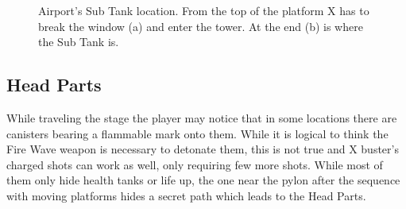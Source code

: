 \begin{figure}[h]
\begin{subfigure}{0.4\linewidth}
 		\caption{}
 	\end{subfigure}
 	\caption{Airport's Sub Tank location. From the top of the platform X has to break the window (a) and enter the tower. At the end (b) is where the Sub Tank is.}
 \end{figure}
 
\subsection{Head Parts} 
 While traveling the stage the player may notice that in some locations there are canisters bearing a flammable mark onto them. While it is logical to think the Fire Wave weapon is necessary to detonate them, this is not true and X buster's charged shots can work as well, only requiring few more shots. While most of them only hide health tanks or life up, the one near the pylon after the sequence with moving platforms hides a secret path which leads to the Head Parts. 
 

